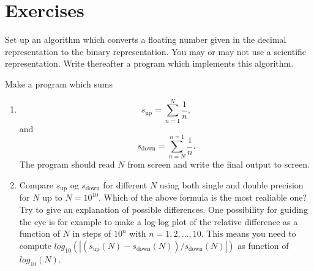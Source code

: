 \section{Exercises}

\begin{prob}
Set up an algorithm
which converts a floating number given in the decimal representation 
to the binary representation. You may or may not use a scientific representation.
Write thereafter a program which implements this algorithm. 
\end{prob}


\begin{prob}
Make a program which sums
\begin{enumerate}
\item
\[
   s_{\mathrm{up}}=\sum_{n=1}^{N}\frac{1}{n},
\]
and
\[
   s_{\mathrm{down}}=\sum_{n=N}^{n=1}\frac{1}{n}.
\]
The program should read $N$ from screen and write the final output to screen.
\item
Compare  $s_{\mathrm{up}}$ og $s_{\mathrm{down}}$ for different $N$ 
using both single and double precision for $N$ up to $N=10^{10}$.
Which of the above formula is the most realiable one? 
Try to give an explanation of possible differences. 
One possibility for guiding the eye is 
for example to make  
a log-log plot of the  relative difference as a function of  $N$ in steps of $10^n$
with $n=1,2,\dots,10$. This means you need to compute 
$log_{10}(|(s_{\mathrm{up}}(N)-s_{\mathrm{down}}(N))/s_{\mathrm{down}}(N)|)$
as function of  $log_{10}(N)$. 
\end{enumerate}
\end{prob}


